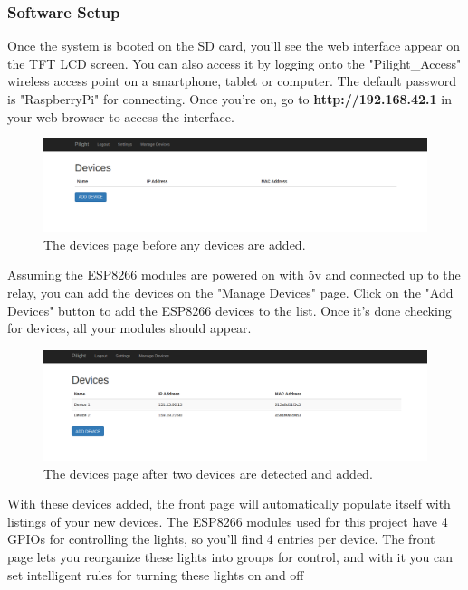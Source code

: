 \subsubsection{Software Setup}
Once the system is booted on the SD card, you'll see the web interface appear on the TFT LCD screen. You can also access it by logging onto the "Pilight\_Access" wireless access point on a smartphone, tablet or computer. The default password is "RaspberryPi" for connecting. Once you're on, go to \textbf{http://192.168.42.1} in your web browser to access the interface.\\
\begin{figure}[h!]
   \includegraphics[width=1.0\textwidth]{devices.png}
   \caption{The devices page before any devices are added.}
\end{figure}
Assuming the ESP8266 modules are powered on with 5v and connected up to the relay, you can add the devices on the "Manage Devices" page. Click on the "Add Devices" button to add the ESP8266 devices to the list. Once it's done checking for devices, all your modules should appear.\\
\begin{figure}[h!]
   \includegraphics[width=1.0\textwidth]{added-devices.png}
   \caption{The devices page after two devices are detected and added.}
\end{figure}
With these devices added, the front page will automatically populate itself with listings of your new devices. The ESP8266 modules used for this project have 4 GPIOs for controlling the lights, so you'll find 4 entries per device. The front page lets you reorganize these lights into groups for control, and with it you can set intelligent rules for turning these lights on and off
